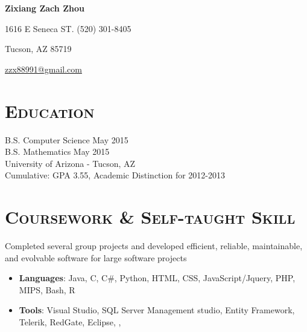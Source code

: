 \documentclass[11.7pt,letterpaper]{article}
\begin{document}
\begin{minipage}{\textwidth}

\begin{center}
\LARGE \bfseries Zixiang Zach Zhou
\end{center}

1616 E Seneca ST. \hfill (520) 301-8405

\vspace{-3mm}
\begin{multicols}{3}
Tucson, AZ 85719 

\begin{center}
\end{center}

\hfill \href{mailto:zzx88991@gmail.com}{zzx88991@gmail.com}

\end{multicols}


\vspace{-1mm}
\vspace{-3mm}
\section{\scshape Education}
\vspace{-2mm}

B.S. Computer Science   \hfill May 2015
\\B.S. Mathematics    \hfill  May 2015
\\University of Arizona - Tucson, AZ
\\Cumulative: GPA 3.55, Academic Distinction for 2012-2013


\vspace{-2mm}
\section{\scshape Coursework \& Self-taught Skill}
\vspace{-3mm}

Completed several group projects and developed efficient, reliable, maintainable, and evolvable software for large software projects
\vspace{0.5mm}
\begin{itemize}
	 \item {\bfseries Languages}: Java, C, C\#, Python, HTML, CSS, JavaScript/Jquery, PHP, MIPS, Bash, R

	\item {\bfseries Tools}: Visual Studio, SQL Server Management studio, Entity Framework, Telerik, RedGate, Eclipse,  \href{https://github.com/zzx88991}{\bfseries \underline{\color{blue}{Git}}}, \textls{\LaTeX}


\end{itemize}
\end{minipage}
\end{document}
